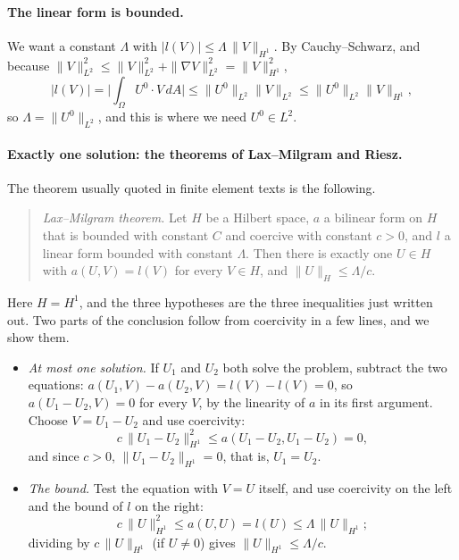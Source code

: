\paragraph{The linear form is bounded.} We want a constant $\Lambda$ with $|l(V)| \le \Lambda\, \|V\|_{H^1}$. By Cauchy--Schwarz, and because $\|V\|_{L^2}^2 \le \|V\|_{L^2}^2 + \|\nabla V\|_{L^2}^2 = \|V\|_{H^1}^2$,
\begin{equation*}
|l(V)| = \Big| \int_\Omega U^0\cdot V\, dA \Big| \leq \|U^0\|_{L^2}\|V\|_{L^2} \leq \|U^0\|_{L^2}\|V\|_{H^1} ,
\end{equation*}
so $\Lambda = \|U^0\|_{L^2}$, and this is where we need $U^0 \in L^2$.

\paragraph{Exactly one solution: the theorems of Lax--Milgram and Riesz.} The theorem usually quoted in finite element texts is the following.
\begin{quote}
\emph{Lax--Milgram theorem.} Let $H$ be a Hilbert space, $a$ a bilinear form on $H$ that is bounded with constant $C$ and coercive with constant $c > 0$, and $l$ a linear form bounded with constant $\Lambda$. Then there is exactly one $U \in H$ with $a(U, V) = l(V)$ for every $V \in H$, and $\|U\|_H \le \Lambda / c$.
\end{quote}
Here $H = H^1$, and the three hypotheses are the three inequalities just written out. Two parts of the conclusion follow from coercivity in a few lines, and we show them.
\begin{itemize}
\item \emph{At most one solution.} If $U_1$ and $U_2$ both solve the problem, subtract the two equations: $a(U_1, V) - a(U_2, V) = l(V) - l(V) = 0$, so $a(U_1 - U_2, V) = 0$ for every $V$, by the linearity of $a$ in its first argument. Choose $V = U_1 - U_2$ and use coercivity:
\begin{equation*}
c\, \|U_1 - U_2\|_{H^1}^2 \le a(U_1 - U_2, U_1 - U_2) = 0 ,
\end{equation*}
and since $c > 0$, $\|U_1 - U_2\|_{H^1} = 0$, that is, $U_1 = U_2$.
\item \emph{The bound.} Test the equation with $V = U$ itself, and use coercivity on the left and the bound of $l$ on the right:
\begin{equation*}
c\, \|U\|_{H^1}^2 \le a(U, U) = l(U) \le \Lambda\, \|U\|_{H^1} ;
\end{equation*}
dividing by $c\, \|U\|_{H^1}$ (if $U \neq 0$) gives $\|U\|_{H^1} \le \Lambda/c$.
\end{itemize}
